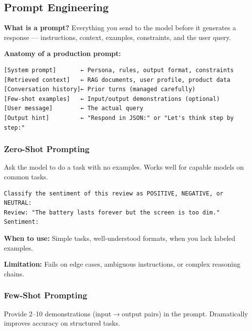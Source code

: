 \documentclass[11pt]{article}
\begin{document}
\subsection{Prompt Engineering}\label{prompt-engineering}

\textbf{What is a prompt?} Everything you send to the model before it generates a response --- instructions, context, examples, constraints, and the user query.

\textbf{Anatomy of a production prompt:}

\setcodelang{}

\begin{verbatim}
[System prompt]       ← Persona, rules, output format, constraints
[Retrieved context]   ← RAG documents, user profile, product data
[Conversation history]← Prior turns (managed carefully)
[Few-shot examples]   ← Input/output demonstrations (optional)
[User message]        ← The actual query
[Output hint]         ← "Respond in JSON:" or "Let's think step by step:"
\end{verbatim}

\subsubsection{Zero-Shot Prompting}\label{zero-shot-prompting}

Ask the model to do a task with no examples. Works well for capable models on common tasks.

\setcodelang{}

\begin{verbatim}
Classify the sentiment of this review as POSITIVE, NEGATIVE, or NEUTRAL:
Review: "The battery lasts forever but the screen is too dim."
Sentiment:
\end{verbatim}

\textbf{When to use:} Simple tasks, well-understood formats, when you lack labeled examples.

\textbf{Limitation:} Fails on edge cases, ambiguous instructions, or complex reasoning chains.

\subsubsection{Few-Shot Prompting}\label{few-shot-prompting}

Provide 2--10 demonstrations (input\(\rightarrow\)output pairs) in the prompt. Dramatically improves accuracy on structured tasks.

\setcodelang{}
\end{document}
